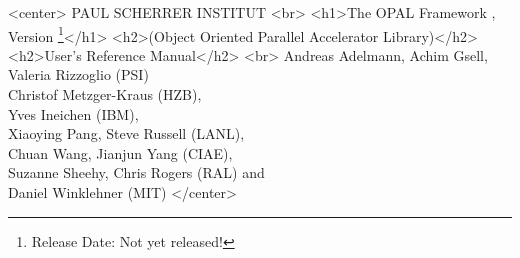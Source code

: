 \documentclass[a4paper]{book}
\begin{document}
\begin{titlepage}

\begin{htmlonly}
\begin{rawhtml}
<center>
PAUL SCHERRER INSTITUT
<br>
<h1>The OPAL Framework , Version \opalversion{} \footnote{Release Date: Not yet released!}</h1>
<h2>(Object Oriented Parallel Accelerator Library)</h2>
<h2>User's Reference Manual</h2>
<br>
Andreas Adelmann, Achim Gsell, Valeria Rizzoglio (PSI)\\ Christof Metzger-Kraus (HZB), \\ Yves Ineichen (IBM),\\ Xiaoying Pang, Steve Russell (LANL),\\ Chuan Wang, Jianjun Yang (CIAE), \\  Suzanne Sheehy, Chris Rogers (RAL) and \\ Daniel Winklehner (MIT)
</center>
\end{rawhtml}
\end{htmlonly}



\end{titlepage}
\end{document}

